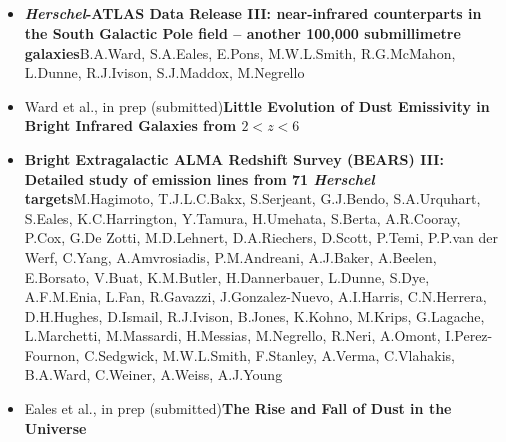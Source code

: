 \subsection*{}

\begin{itemize}
  \item[]{\citealt{Ward_2022}\newline\textbf{\textit{Herschel}-ATLAS Data Release III: near-infrared counterparts in the South Galactic Pole field -- another 100,000 submillimetre galaxies}\newline B.A.Ward, S.A.Eales, E.Pons, M.W.L.Smith, R.G.McMahon, L.Dunne, R.J.Ivison, S.J.Maddox, M.Negrello}
  
  \item[]{Ward et al., in prep (submitted)}\newline\textbf{Little Evolution of Dust Emissivity in Bright Infrared Galaxies from $2 < z < 6$}
\end{itemize} 


\begin{itemize}

  \item[]{\citealt{Hagimoto_2023}\newline\textbf{Bright Extragalactic ALMA Redshift Survey (BEARS) III: Detailed study of emission lines from 71 \textit{Herschel} targets}\newline M.Hagimoto, T.J.L.C.Bakx, S.Serjeant, G.J.Bendo, S.A.Urquhart, S.Eales, K.C.Harrington, Y.Tamura, H.Umehata, S.Berta, A.R.Cooray, P.Cox, G.De Zotti, M.D.Lehnert, D.A.Riechers, D.Scott, P.Temi, P.P.van der Werf, C.Yang, A.Amvrosiadis, P.M.Andreani, A.J.Baker, A.Beelen, E.Borsato, V.Buat, K.M.Butler, H.Dannerbauer, L.Dunne, S.Dye, A.F.M.Enia, L.Fan, R.Gavazzi, J.Gonzalez-Nuevo, A.I.Harris, C.N.Herrera, D.H.Hughes, D.Ismail, R.J.Ivison, B.Jones, K.Kohno, M.Krips, G.Lagache, L.Marchetti, M.Massardi, H.Messias, M.Negrello, R.Neri, A.Omont, I.Perez-Fournon, C.Sedgwick, M.W.L.Smith, F.Stanley, A.Verma, C.Vlahakis, B.A.Ward, C.Weiner, A.Weiss, A.J.Young}
  
  \item[]{Eales et al., in prep (submitted)}\newline\textbf{The Rise and Fall of Dust in the Universe}
 
\end{itemize}  